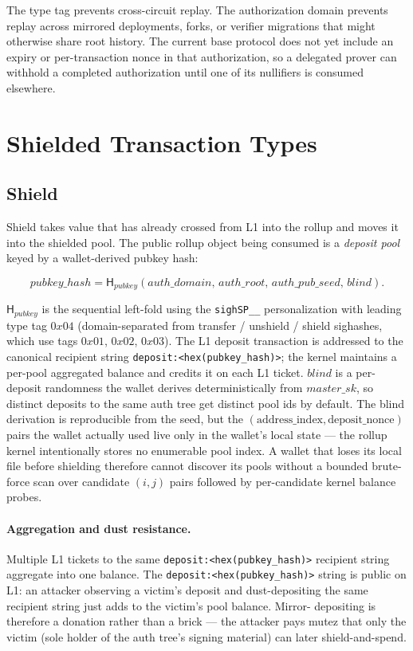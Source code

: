 \documentclass[11pt]{article}
\newcommand{\Hash}{\mathsf{H}}
\newcommand{\depositkey}{\texttt{deposit:}\allowbreak\texttt{<hex(}\allowbreak\texttt{pubkey\_hash}\allowbreak\texttt{)>}}
\begin{document}
The type tag prevents cross-circuit replay. The authorization domain prevents
replay across mirrored deployments, forks, or verifier migrations that might
otherwise share root history. The current base protocol does not yet include an
expiry or per-transaction nonce in that authorization, so a delegated prover
can withhold a completed authorization until one of its nullifiers is consumed
elsewhere.

\section{Shielded Transaction Types}

\subsection{Shield}

Shield takes value that has already crossed from L1 into the rollup and moves it
into the shielded pool. The public rollup object being consumed is a
\emph{deposit pool} keyed by a wallet-derived pubkey hash:

\[
pubkey\_hash = \Hash_{pubkey}(auth\_domain,\, auth\_root,\, auth\_pub\_seed,\, blind).
\]

\(\Hash_{pubkey}\) is the sequential left-fold using the \texttt{sighSP\_\_}
personalization with leading type tag \(0x04\) (domain-separated from
transfer / unshield / shield sighashes, which use tags \(0x01\), \(0x02\),
\(0x03\)). The L1 deposit transaction is addressed to the canonical
recipient string \texttt{deposit:<hex(pubkey\_hash)>}; the kernel
maintains a per-pool aggregated balance and credits it on each L1 ticket.
\(blind\) is a per-deposit randomness the wallet derives
deterministically from \(master\_sk\), so distinct deposits to the
same auth tree get distinct pool ids by default. The blind derivation
is reproducible from the seed, but the
\((\textrm{address\_index}, \textrm{deposit\_nonce})\) pairs the wallet
actually used live only in the wallet's local state — the rollup
kernel intentionally stores no enumerable pool index. A wallet that
loses its local file before shielding therefore cannot discover its
pools without a bounded brute-force scan over candidate
\((i, j)\) pairs followed by per-candidate kernel balance probes.

\paragraph{Aggregation and dust resistance.} Multiple L1 tickets to the
same \depositkey{} recipient string aggregate into
one balance. The \depositkey{} string is public on
L1: an attacker observing a victim's deposit and dust-depositing the
same recipient string just adds to the victim's pool balance. Mirror-
depositing is therefore a donation rather than a brick — the attacker pays
mutez that only the victim (sole holder of the auth tree's signing
material) can later shield-and-spend.
\end{document}

